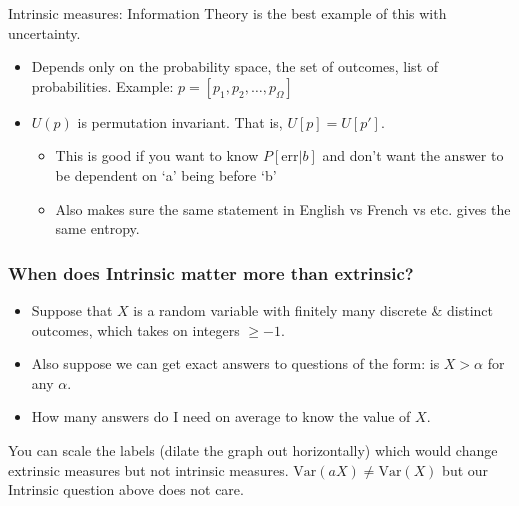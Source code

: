 Intrinsic measures: Information Theory is the best example of this with uncertainty.
\begin{itemize}
    \item Depends only on the probability space, the set of outcomes, list of probabilities. Example: \( p=[p_1, p_2, \ldots, p_\Omega] \)
    \item \( U(p) \) is permutation invariant. That is, \( U[p]=U[p'] \).
    \begin{itemize}
        \item This is good if you want to know \( P[\text{err} | b] \) and don’t want the answer to be dependent on ‘a’ being before ‘b’
        \item Also makes sure the same statement in English vs French vs etc. gives the same entropy.
    \end{itemize}
\end{itemize}

\subsubsection{When does Intrinsic matter more than extrinsic?}
\begin{itemize}
    \item Suppose that \( X \) is a random variable with finitely many discrete \& distinct outcomes, which takes on integers \( \geq -1 \).
    \item Also suppose we can get exact answers to questions of the form: is \( X > \alpha \) for any \( \alpha \).
    \item How many answers do I need on average to know the value of \( X \).
\end{itemize}

You can scale the labels (dilate the graph out horizontally) which would change extrinsic measures but not intrinsic measures. \( \text{Var}(aX) \neq \text{Var}(X) \) but our Intrinsic question above does not care.
